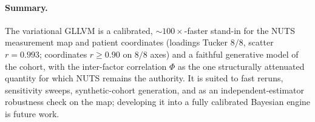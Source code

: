 \paragraph{Summary.} The variational GLLVM is a calibrated, ${\sim}100\times$-faster stand-in for
the NUTS measurement map and patient coordinates (loadings Tucker $8/8$, scatter $r=0.993$;
coordinates $r\ge0.90$ on $8/8$ axes) and a faithful generative model of the cohort, with the
inter-factor correlation $\Phi$ as the one structurally attenuated quantity for which NUTS
remains the authority. It is suited to fast reruns, sensitivity sweeps, synthetic-cohort
generation, and as an independent-estimator robustness check on the map; developing it into a
fully calibrated Bayesian engine is future work.
